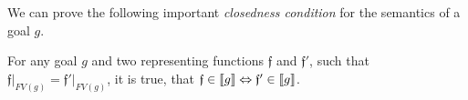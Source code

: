 \begin{comment}
Here is an example of denotational semantics of a goal:

\[
\begin{array}{lc}
  \sembr{\mbox{\lstinline|fresh y . ($\alpha$ === y) $\,\wedge\,$ (y === Zero)|}}&\overset{\mbox{(by \textsc{Fresh$_D$})}}{=}\\
  (\sembr{\mbox{\lstinline|($\alpha$ === $\beta$) $\,\wedge\,$ ($\beta$ === Zero)|}})\uparrow\beta&\overset{\mbox{(by \textsc{Conj$_D$})}}{=}\\
  (\sembr{\mbox{\lstinline|$\alpha$ === $\beta$|}} \,\cap\, \sembr{\mbox{\lstinline|$\beta$ === Zero)|}})\uparrow\beta&\overset{\mbox{(by \textsc{Unify$_D$})}}{=}\\
  (\{\mathfrak{f}\mid \overline{\mathfrak{f}}\,(\alpha)=\overline{\mathfrak{f}}\,(\beta)\} \,\cap\, \{\mathfrak{f}\mid \overline{\mathfrak{f}}\,(\beta)=\overline{\mathfrak{f}}\,(\mbox{\lstinline|Zero|})\})\uparrow\beta&\overset{\mbox{(by the definition of ``$\overline{\mathfrak{f}}$'')}}{=}\\
  (\{\mathfrak{f}\mid \mathfrak{f}\,(\alpha)=\mathfrak{f}\,(\beta)\} \,\cap\, \{\mathfrak{f}\mid \mathfrak{f}\,(\beta)=\mbox{\lstinline|Zero|}\})\uparrow\beta&\overset{\mbox{(by the definition of ``$\cap$'')}}{=}\\
  (\{\mathfrak{f}\mid \mathfrak{f}\,(\alpha)=\mathfrak{f}\,(\beta)=\mbox{\lstinline|Zero|}\})\uparrow\beta&\overset{\mbox{(by the definition of ``$\uparrow$'')}}{=}\\
  \{\mathfrak{f}\mid \mathfrak{f}\,(\alpha)=\mbox{\lstinline|Zero|}, \mathfrak{f}\,(\beta)=d, d\in\mathcal{D}\}&\overset{\mbox{(by the totality of representing functions)}}{=}\\[1mm]
  \{\mathfrak{f}\mid \mathfrak{f}\,(\alpha)=\mbox{\lstinline|Zero|}\}&
\end{array}
\]

In the end, we've got the set of representing functions, each of which restricts only the value of the free variable $\alpha$.
\end{comment}

We can prove the following important \emph{closedness condition} for the semantics of a goal $g$.

\begin{lemma}
\label{lem:closedness_condition}
For any goal $g$ and two representing functions ${\mathfrak f}$ and ${\mathfrak f'}$, such that $\left.{\mathfrak f}\right|_{FV(g)} = \left.{\mathfrak f'}\right|_{FV(g)}$, it is true, that
${\mathfrak f} \in \llbracket{g}\rrbracket \Leftrightarrow {\mathfrak f'} \in \llbracket{g}\rrbracket$.
\end{lemma}

